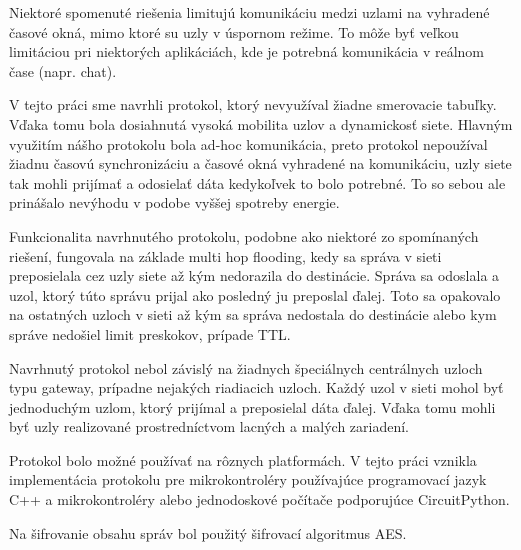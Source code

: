 \documentclass[slovak,master]{diploma}
\begin{document}
Niektoré spomenuté riešenia limitujú komunikáciu medzi uzlami na vyhradené časové okná, mimo ktoré su uzly v úspornom režime. To môže byť 
veľkou limitáciou pri niektorých aplikáciách, kde je potrebná komunikácia v reálnom čase  (napr. chat).

V tejto práci sme navrhli protokol, ktorý nevyužíval žiadne smerovacie tabuľky. Vďaka tomu bola dosiahnutá vysoká mobilita uzlov a dynamickosť siete. 
Hlavným využitím nášho protokolu bola ad-hoc komunikácia, preto protokol nepoužíval 
žiadnu časovú synchronizáciu a časové okná vyhradené na komunikáciu, uzly siete tak mohli prijímať a odosielať dáta kedykoľvek to bolo potrebné.
To so sebou ale prinášalo nevýhodu v podobe vyššej spotreby energie.

Funkcionalita navrhnutého protokolu, podobne ako niektoré zo spomínaných riešení, fungovala na základe multi hop flooding, 
kedy sa správa v sieti preposielala cez uzly siete až kým nedorazila do destinácie.
Správa sa odoslala a uzol, ktorý túto správu prijal ako posledný ju preposlal ďalej. Toto sa opakovalo na ostatných uzloch v sieti až kým sa správa nedostala do destinácie alebo kym správe nedošiel limit preskokov, prípade TTL.

Navrhnutý protokol nebol závislý na žiadnych špeciálnych centrálnych uzloch typu gateway, prípadne nejakých riadiacich uzloch. Každý uzol v sieti mohol byť jednoduchým uzlom, ktorý prijímal a preposielal dáta ďalej.
Vďaka tomu mohli byť uzly realizované prostredníctvom lacných a malých zariadení.

Protokol bolo možné používať na rôznych platformách. V tejto práci vznikla implementácia protokolu pre mikrokontroléry používajúce programovací jazyk C++ a 
mikrokontroléry alebo jednodoskové počítače podporujúce CircuitPython.

Na šifrovanie obsahu správ bol použitý šifrovací algoritmus AES.
\end{document}
